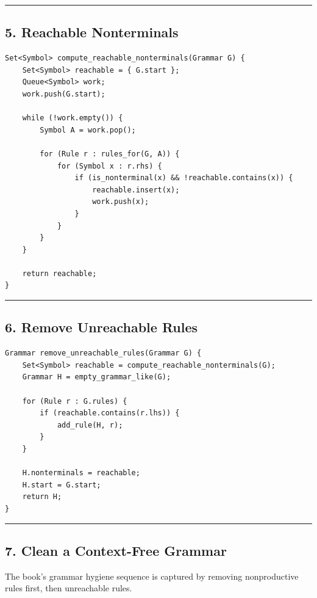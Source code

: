 \documentclass[10pt,letterpaper]{article}
\begin{document}
\medskip\hrule\medskip

\subsection*{5. Reachable Nonterminals}

\begin{verbatim}
Set<Symbol> compute_reachable_nonterminals(Grammar G) {
    Set<Symbol> reachable = { G.start };
    Queue<Symbol> work;
    work.push(G.start);

    while (!work.empty()) {
        Symbol A = work.pop();

        for (Rule r : rules_for(G, A)) {
            for (Symbol x : r.rhs) {
                if (is_nonterminal(x) && !reachable.contains(x)) {
                    reachable.insert(x);
                    work.push(x);
                }
            }
        }
    }

    return reachable;
}
\end{verbatim}

\medskip\hrule\medskip

\subsection*{6. Remove Unreachable Rules}

\begin{verbatim}
Grammar remove_unreachable_rules(Grammar G) {
    Set<Symbol> reachable = compute_reachable_nonterminals(G);
    Grammar H = empty_grammar_like(G);

    for (Rule r : G.rules) {
        if (reachable.contains(r.lhs)) {
            add_rule(H, r);
        }
    }

    H.nonterminals = reachable;
    H.start = G.start;
    return H;
}
\end{verbatim}

\medskip\hrule\medskip

\subsection*{7. Clean a Context-Free Grammar}

The book's grammar hygiene sequence is captured by removing nonproductive rules first, then unreachable rules.
\end{document}
